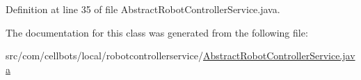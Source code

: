 Definition at line 35 of file Abstract\-Robot\-Controller\-Service.\-java.



The documentation for this class was generated from the following file\-:\begin{DoxyCompactItemize}
\item 
src/com/cellbots/local/robotcontrollerservice/\hyperlink{_abstract_robot_controller_service_8java}{Abstract\-Robot\-Controller\-Service.\-java}\end{DoxyCompactItemize}
